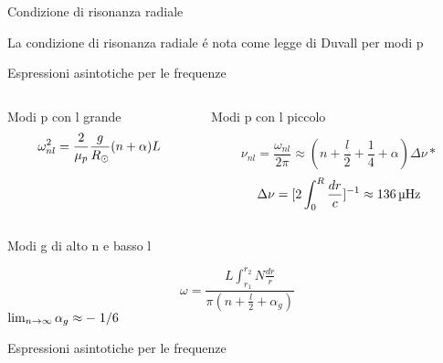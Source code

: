 \documentclass[10pt,xcolor={usenames},fleqn,mathserif,serif]{beamer}
\begin{document}
\begin{wordonframe}{Condizione di risonanza radiale}

La condizione di risonanza radiale \'e nota come legge di Duvall per modi p

\end{wordonframe}

\begin{frame}{Espressioni asintotiche per le frequenze}

\begin{columns}

\begin{column}{0.5\textwidth}

\begin{block}{Modi p con l grande}
\begin{equation*}
\omega_{nl}^2=\frac{2}{\mu_p}\frac{g}{R_{\odot}{}}(n+\alpha)L
\end{equation*}
\end{block}

\end{column}

\begin{column}{0.5\textwidth}

\begin{block}{Modi p con l piccolo}

\begin{equation*}
\nu_{nl}=\frac{\omega_{nl}}{2\pi}\approx(n+\frac{l}{2}+\frac{1}{4}+\alpha)\Delta\nu*\label{eq:freqequi}
\end{equation*}
\[\Delta\nu=[2\int_0^R\frac{dr}{c}]^{-1}\approx\SI{136}{\micro\hertz}\]

\end{block}

\end{column}

\end{columns}

\begin{block}{Modi g di alto n e basso l}

\begin{equation*}
\omega=\frac{L\int_{r_1}^{r_2}N\frac{dr}{r}}{\pi(n+\frac{l}{2}+\alpha_g)}
\end{equation*}
 $\lim_{n\to\infty}{\alpha_g}\approx-\left.{1}\middle/{6}\right.$

\end{block}

\end{frame}

\begin{wordonframe}{Espressioni asintotiche per le frequenze}

\end{wordonframe}
\end{document}
